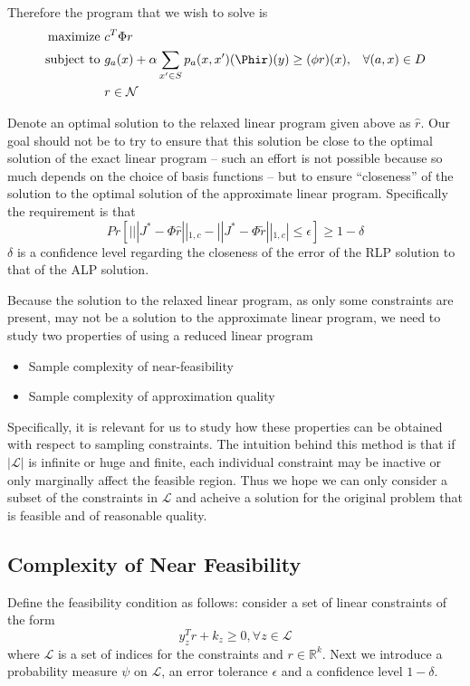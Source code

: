 \documentclass[12pt,reqno]{amsart}
\newcommand{\R}{\ensuremath{\mathbb{R}}}
\newcommand{\sN}{\mathcal{N}}
\newcommand{\sL}{\mathcal{L}}
\numberwithin{equation}{section}
\begin{document}
Therefore the program that we wish to solve is
\begin{align*}
\text{maximize } & c^T \Phi r & \\
\text{subject to } & g_a(x) + \alpha \sum_{x' \in S} p_a(x,x')(\Phir)(y) \geq (\phi r) (x), & \forall (a,x) \in D \\
& r \in \sN & \\
\end{align*}

Denote an optimal solution to the relaxed linear program given above as $\hat{r}$. Our goal should not be to try to ensure that this solution be close to the optimal solution of the exact linear program -- such an effort is not possible because so much depends on the choice of basis functions -- but to ensure ``closeness'' of the solution to the optimal solution of the approximate linear program. Specifically the requirement is that
$$
Pr[ | ||J^* - \Phi\hat{r}||_{1,c} - ||J^* - \Phi \tilde{r}||_{1,c}| \leq \epsilon ] \geq 1 -\delta
$$
$\delta$ is a confidence level regarding the closeness of the error of the RLP solution to that of the ALP solution.

Because the solution to the relaxed linear program, as only some constraints are present, may not be a solution to the approximate linear program, we need to study two properties of using a reduced linear program
\begin{itemize}
\item Sample complexity of near-feasibility
\item Sample complexity of approximation quality
\end{itemize}

Specifically, it is relevant for us to study how these properties can be obtained with respect to sampling constraints. The intuition behind this method is that if $|\sL|$ is infinite or huge and finite, each individual constraint may be inactive or only marginally affect the feasible region. Thus we hope we can only consider a subset of the constraints in $\sL$ and acheive a solution for the original problem that is feasible and of reasonable quality.

\subsection{Complexity of Near Feasibility}
Define the feasibility condition as follows: consider a set of linear constraints of the form
$$
y_z^T r + k_z \geq 0, \forall z \in \sL
$$
where $\sL$ is a set of indices for the constraints and $r \in \R^k$. Next we introduce a probability measure $\psi$ on $\sL$, an error tolerance $\epsilon$ and a confidence level $1-\delta$. 
\end{document}
